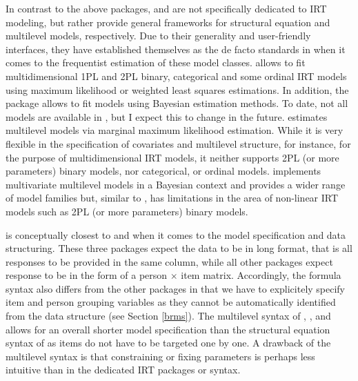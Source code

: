 \documentclass[
]{jss}
\begin{document}
In contrast to the above packages,  and  are not
specifically dedicated to IRT modeling, but rather provide general
frameworks for structural equation and multilevel models, respectively.
Due to their generality and user-friendly interfaces, they have
established themselves as the de facto standards in  when it
comes to the frequentist estimation of these model classes. 
allows to fit multidimensional 1PL and 2PL binary, categorical and some
ordinal IRT models using maximum likelihood or weighted least squares
estimations. In addition, the  package allows to fit
 models using Bayesian estimation methods. To date, not all
 models are available in , but I expect this to
change in the future.  estimates multilevel models via
marginal maximum likelihood estimation. While it is very flexible in the
specification of covariates and multilevel structure, for instance, for
the purpose of multidimensional IRT models, it neither supports 2PL (or
more parameters) binary models, nor categorical, or ordinal models.
 implements multivariate multilevel models in a Bayesian
context and provides a wider range of model families but, similar to
, has limitations in the area of non-linear IRT models such as
2PL (or more parameters) binary models.

 is conceptually closest to  and  when
it comes to the model specification and data structuring. These three
packages expect the data to be in long format, that is all responses to
be provided in the same column, while all other packages expect response
to be in the form of a person \(\times\) item matrix. Accordingly, the
formula syntax also differs from the other packages in that we have to
explicitely specify item and person grouping variables as they cannot be
automatically identified from the data structure (see Section
\ref{brms}). The multilevel syntax of , , and
 allows for an overall shorter model specification than the
structural equation syntax of  as items do not have to be
targeted one by one. A drawback of the multilevel syntax is that
constraining or fixing parameters is perhaps less intuitive than in the
dedicated IRT packages or  syntax.
\end{document}
